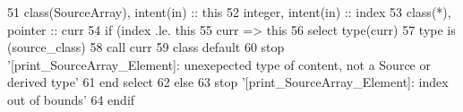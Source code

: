 \begin{DoxyCode}
51     \textcolor{keywordtype}{class}(SourceArray), \textcolor{keywordtype}{intent(in)} :: this
52     \textcolor{keywordtype}{integer}, \textcolor{keywordtype}{intent(in)} :: index
53     \textcolor{keywordtype}{class}(*), \textcolor{keywordtype}{pointer} :: curr
54     \textcolor{keywordflow}{if} (index .le. this%
55         curr => this%
56         \textcolor{keywordflow}{select type}(curr)
57 \textcolor{keywordflow}{        type is} (source\_class)
58             \textcolor{keyword}{call }curr%
59 \textcolor{keywordflow}{            class default}
60             stop \textcolor{stringliteral}{'[print\_SourceArray\_Element]: unexepected type of content, not a Source or derived type'}
61 \textcolor{keywordflow}{        end select}
62     \textcolor{keywordflow}{else}
63         stop \textcolor{stringliteral}{'[print\_SourceArray\_Element]: index out of bounds'}
64 \textcolor{keywordflow}{    endif}
\end{DoxyCode}
